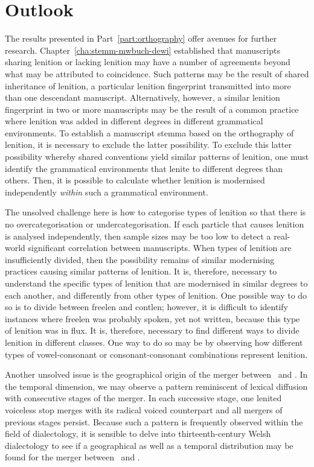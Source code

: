 \section{Outlook}
\label{sec:further-research}
The results presented in Part~\ref{part:orthography} offer avenues for further research. 
Chapter~\ref{cha:stemm-mwbuch-dewi} established that manuscripts sharing lenition or lacking lenition may have a number of agreements beyond what may be attributed to coincidence. Such patterns may be the result of shared inheritance of lenition, \ie a particular lenition fingerprint transmitted into more than one descendant manuscript. Alternatively, however, a similar lenition fingerprint in two or more manuscripts may be the result of a common practice where lenition was added in different degrees in different grammatical environments. To establish a manuscript stemma based on the orthography of lenition, it is necessary to exclude the latter possibility. To exclude this latter possibility whereby shared conventions yield similar patterns of lenition, one must identify the grammatical environments that lenite to different degrees than others. Then, it is possible to calculate whether lenition is modernised independently \emph{within} such a grammatical environment.

The unsolved challenge here is how to categorise types of lenition so that there is no overcategorisation or undercategorisation. If each particle that causes lenition is analysed independently, then sample sizes may be too low to detect a real-world significant correlation between manuscripts. When types of lenition are insufficiently divided, then the possibility remains of similar modernising practices causing similar patterns of lenition. It is, therefore, necessary to understand the specific types of lenition that  are modernised in similar degrees to each another, and differently from other types of lenition. One possible way to do so is to divide between \gls{freelen} and \gls{contlen}; however, it is difficult to identify instances where \gls{freelen} was probably spoken, yet not written, because this type of lenition was in flux. It is, therefore, necessary to find different ways to divide lenition in different classes. One way to do so may be by observing how different types of vowel-consonant or consonant-consonant combinations represent lenition.

Another unsolved issue is the geographical origin of the merger between \lT\ and \xD. In the temporal dimension, we may observe a pattern reminiscent of lexical diffusion with consecutive stages of the merger. In each successive stage, one lenited voiceless stop merges with its radical voiced counterpart and all mergers of previous stages persist. Because such a pattern is frequently observed within the field of dialectology, it is sensible to delve into thirteenth-century Welsh dialectology to see if a geographical as well as a temporal distribution may be found for the merger between \lT\ and \xD.

